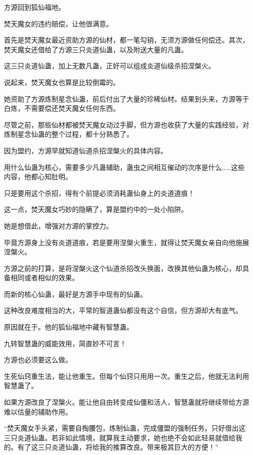 
\begin{this_body}

方源回到狐仙福地。

焚天魔女的违约赔偿，让他很满意。

首先是焚天魔女最近资助方源的仙材，都一笔勾销，无须方源做任何偿还。其次，焚天魔女还借给了方源三只炎道仙蛊，以及附送大量的凡蛊。

这三只炎道仙蛊，加上无数凡蛊，正好可以组成炎道仙级杀招涅槃火。

说起来，焚天魔女也算是比较倒霉的。

她资助了方源炼制星念仙蛊，前后付出了大量的珍稀仙材。结果到头来，方源等于白炼，不需要偿还焚天魔女任何东西。

尽管之前，那些仙材都被焚天魔女动过手脚，但方源也收获了大量的实践经验，对炼制星念仙蛊的整个过程，都十分熟悉了。

因为盟约，方源早就知道仙道杀招涅槃火的具体内容。

用什么仙蛊为核心，需要多少凡蛊辅助，蛊虫之间相互催动的次序是什么……这些内容，他都心知肚明。

只是要用这个杀招，得有个前提必须消耗蛊仙身上的炎道道痕！

这一点，焚天魔女巧妙的隐瞒了，算是盟约中的一处小陷阱。

她是想借此，增强对方源的掌控力。

毕竟方源身上没有炎道道痕，若是要用涅槃火重生，就得让焚天魔女亲自向他施展涅槃火。

方源之前的打算，是将涅槃火这个仙道杀招改头换面，改换其他仙蛊为核心，却具备相同或者相似的效果。

而新的核心仙蛊，最好是方源手中现有的仙蛊。

这种改良难度相当的大，平常的智道蛊仙都没有这个自信，但方源却大有底气。

原因就在于。他的狐仙福地中藏有智慧蛊。

九转智慧蛊的威能效用，简直妙不可言！

方源也必须要这么做。

生死仙窍重生法，能让他重生。但每个仙窍只用用一次。重生之后，他就无法利用智慧蛊了。

如果方源改良了涅槃火。能让他自由转变成仙僵和活人，智慧蛊就将继续带给方源难以估量的辅助作用。

“焚天魔女手头紧，需要自掏腰包，炼制仙蛊，完成僵盟的强制任务。只好借出这三只炎道仙蛊。若非如此情境，就算我主动要求，她也绝不会如此轻易就借给我的。有了这三只炎道仙蛊，将给我的推算改良。带来极其巨大的方便！”


\end{this_body}
